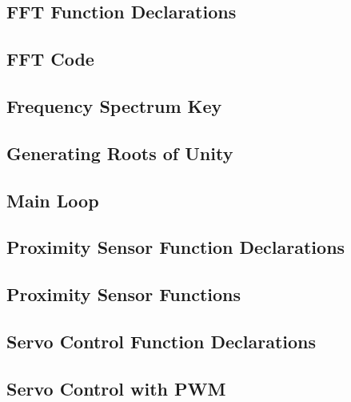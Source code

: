 \documentclass[10pt]{article}           %
\begin{document}


\subsection{FFT Function Declarations}
\label{sub:fft_function_declarations}



\subsection{FFT Code}
\label{sub:fft_code}



\subsection{Frequency Spectrum Key}
\label{sub:frequency_spectrum_key}



\subsection{Generating Roots of Unity}
\label{sub:generating_roots_of_unity}



\subsection{Main Loop}
\label{sub:main_loop}



\subsection{Proximity Sensor Function Declarations}
\label{sub:proximity_sensor_function_declarations}



\subsection{Proximity Sensor Functions}
\label{sub:proximity_sensor_functions}



\subsection{Servo Control Function Declarations}
\label{sub:servo_control_function_declarations}



\subsection{Servo Control with PWM}
\label{sub:servo_control_with_pwm}


\end{document}
